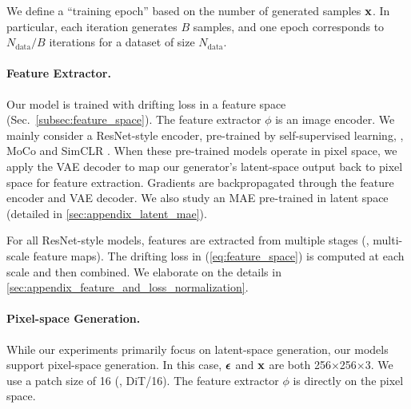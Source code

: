 We define a ``training epoch'' based on the number of generated samples $\mathbf{x}$.
In particular, each iteration generates $B$ samples, and one epoch corresponds to $N_\text{data}/B$ iterations for a dataset of size $N_\text{data}$.

\paragraph{Feature Extractor.} Our model is trained with drifting loss in a feature space (Sec.~\ref{subsec:feature_space}). 
The feature extractor $\phi$ is an image encoder.
We mainly consider a ResNet-style \cite{he2016deep} encoder, pre-trained by self-supervised learning, \eg, MoCo \cite{he2020momentum} and SimCLR \cite{chen2020simple}.
When these pre-trained models operate in pixel space, we apply the VAE decoder to map our generator’s latent-space output back to pixel space for feature extraction. Gradients are backpropagated through the feature encoder and VAE decoder.
We also study an MAE \cite{he2022masked} pre-trained in latent space (detailed in \ref{sec:appendix_latent_mae}).

For all ResNet-style models, features are extracted from multiple stages (\ie, multi-scale feature maps). The drifting loss in (\ref{eq:feature_space}) is computed at each scale and then combined. We elaborate on the details in \ref{sec:appendix_feature_and_loss_normalization}.


\paragraph{Pixel-space Generation.} 
While our experiments primarily focus on latent-space generation, our models support pixel-space generation. In this case, ${\boldsymbol{\epsilon}}$ and $\mathbf{x}$ are both 256$\times$256$\times$3. We use a patch size of 16 (\ie, DiT/16). The feature extractor $\phi$ is directly on the pixel space.


